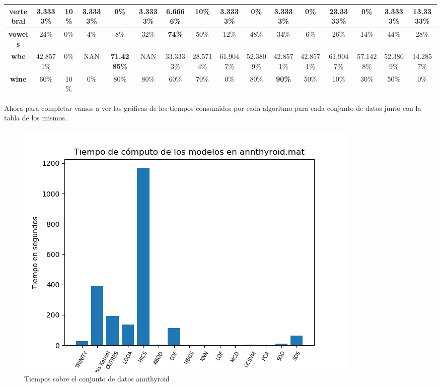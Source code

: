 \begin{table}
{\begin{tabular}{|c|c|c|c|c|c|c|c|c|c|c|c|c|c|c|c|}
		\textbf{vertebral}        & 3.3333\%           & 10\%               & 3.3333\%        & 0\%                & 3.3333\%      & 6.6666\%           & 10\%               & 3.3333\%           & 0\%          & 3.3333\%           & 0\%                & \textbf{23.3333\%} & 0\%                & 3.3333\%           & 13.3333\%    \\ \hline
		\textbf{vowels}           & 24\%               & 0\%                & 4\%             & 8\%                & 32\%          & \textbf{74\%}      & 50\%               & 12\%               & 48\%         & 34\%               & 6\%                & 26\%               & 14\%               & 44\%               & 28\%         \\ \hline
		\textbf{wbc}              & 42.8571\%          & 0\%                & NAN             & \textbf{71.4285\%} & NAN           & 33.3333\%          & 28.5714\%          & 61.9047\%          & 52.3809\%    & 42.8571\%          & 42.8571\%          & 61.9047\%          & 57.1428\%          & 52.3809\%          & 14.2857\%    \\ \hline
		\textbf{wine}             & 60\%               & 10\%               & 0\%             & 80\%               & 80\%          & 60\%               & 70\%               & 0\%                & 80\%         & \textbf{90\%}      & 50\%               & 10\%               & 30\%               & 50\%               & 0\%          \\ \hline
	\end{tabular}
}
\end{table}

\clearpage

Ahora para completar vamos a ver las gráficas de los tiempos consumidos por cada algoritmo para cada conjunto de datos junto con la tabla de los mismos.

\begin{figure}[H]
	\centering
	\includegraphics[scale=0.7]{imagenes/imgs-exp1/times/annthyroid}
	\caption{Tiempos sobre el conjunto de datos annthyroid}
	\label{annthyroid_times}
\end{figure}

